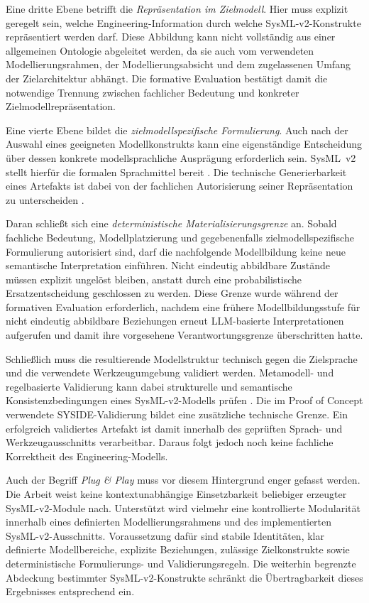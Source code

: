 Eine dritte Ebene betrifft die \emph{Repräsentation im Zielmodell}. Hier muss
explizit geregelt sein, welche Engineering-Information durch welche
SysML-v2-Konstrukte repräsentiert werden darf. Diese Abbildung kann nicht
vollständig aus einer allgemeinen Ontologie abgeleitet werden, da sie auch
vom verwendeten Modellierungsrahmen, der Modellierungsabsicht und dem
zugelassenen Umfang der Zielarchitektur abhängt. Die formative Evaluation
bestätigt damit die notwendige Trennung zwischen fachlicher Bedeutung und
konkreter Zielmodellrepräsentation.

Eine vierte Ebene bildet die \emph{zielmodellspezifische Formulierung}.
Auch nach der Auswahl eines geeigneten Modellkonstrukts kann eine
eigenständige Entscheidung über dessen konkrete modellsprachliche Ausprägung
erforderlich sein. SysML~v2 stellt hierfür die formalen Sprachmittel bereit
\cite{SysMLv2}. Die technische Generierbarkeit eines Artefakts ist dabei von
der fachlichen Autorisierung seiner Repräsentation zu unterscheiden
\cite{Stein2026,Pan.2025,Cibrian.2025}.

Daran schließt sich eine \emph{deterministische Materialisierungsgrenze} an.
Sobald fachliche Bedeutung, Modellplatzierung und gegebenenfalls
zielmodellspezifische Formulierung autorisiert sind, darf die nachfolgende
Modellbildung keine neue semantische Interpretation einführen. Nicht
eindeutig abbildbare Zustände müssen explizit ungelöst bleiben, anstatt durch
eine probabilistische Ersatzentscheidung geschlossen zu werden. Diese Grenze
wurde während der formativen Evaluation erforderlich, nachdem eine frühere
Modellbildungsstufe für nicht eindeutig abbildbare Beziehungen erneut
LLM-basierte Interpretationen aufgerufen und damit ihre vorgesehene
Verantwortungsgrenze überschritten hatte.

Schließlich muss die resultierende Modellstruktur technisch gegen die
Zielsprache und die verwendete Werkzeugumgebung validiert werden.
Metamodell- und regelbasierte Validierung kann dabei strukturelle und
semantische Konsistenzbedingungen eines SysML-v2-Modells prüfen
\cite{Cibrian.2025b}. Die im Proof of Concept verwendete SYSIDE-Validierung
bildet eine zusätzliche technische Grenze. Ein erfolgreich validiertes
Artefakt ist damit innerhalb des geprüften Sprach- und Werkzeugausschnitts
verarbeitbar. Daraus folgt jedoch noch keine fachliche Korrektheit des
Engineering-Modells.

Auch der Begriff \emph{Plug \& Play} muss vor diesem Hintergrund enger
gefasst werden. Die Arbeit weist keine kontextunabhängige Einsetzbarkeit
beliebiger erzeugter SysML-v2-Module nach. Unterstützt wird vielmehr eine
kontrollierte Modularität innerhalb eines definierten Modellierungsrahmens
und des implementierten SysML-v2-Ausschnitts. Voraussetzung dafür sind stabile
Identitäten, klar definierte Modellbereiche, explizite Beziehungen,
zulässige Zielkonstrukte sowie deterministische Formulierungs- und
Validierungsregeln. Die weiterhin begrenzte Abdeckung bestimmter
SysML-v2-Konstrukte schränkt die Übertragbarkeit dieses Ergebnisses
entsprechend ein.

